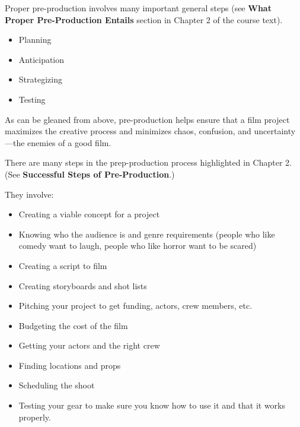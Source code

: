 \documentclass[
]{book}
\providecommand{\tightlist}{%
  \setlength{\itemsep}{0pt}\setlength{\parskip}{0pt}}
\begin{document}
Proper pre-production involves many important general steps (see \textbf{What Proper Pre-Production Entails} section in Chapter 2 of the course text).

\begin{itemize}
\tightlist
\item
  Planning\\
\item
  Anticipation\\
\item
  Strategizing\\
\item
  Testing
\end{itemize}

As can be gleaned from above, pre-production helps ensure that a film project maximizes the creative process and minimizes chaos, confusion, and uncertainty---the enemies of a good film.

There are many steps in the prep-production process highlighted in Chapter 2. (See \textbf{Successful Steps of Pre-Production}.)

They involve:

\begin{itemize}
\tightlist
\item
  Creating a viable concept for a project\\
\item
  Knowing who the audience is and genre requirements (people who like comedy want to laugh, people who like horror want to be scared)\\
\item
  Creating a script to film\\
\item
  Creating storyboards and shot lists\\
\item
  Pitching your project to get funding, actors, crew members, etc.\\
\item
  Budgeting the cost of the film\\
\item
  Getting your actors and the right crew\\
\item
  Finding locations and props\\
\item
  Scheduling the shoot\\
\item
  Testing your gear to make sure you know how to use it and that it works properly.
\end{itemize}
\end{document}

